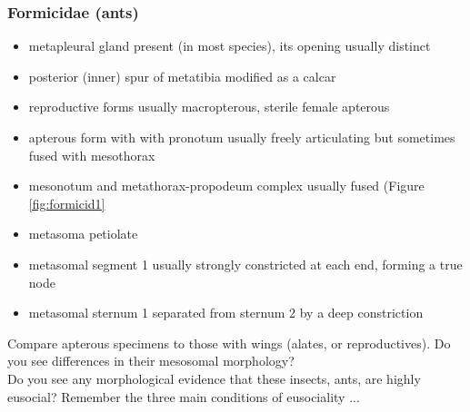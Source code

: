 \documentclass[letterpaper, 11pt]{article}
\begin{document}
\subsubsection{Formicidae (ants)}
\begin{itemize}
\item metapleural gland present (in most species), its opening usually distinct
\item posterior (inner) spur of metatibia modified as a calcar 
\item reproductive forms usually macropterous, sterile female apterous 
\item apterous form with with pronotum usually freely articulating but sometimes fused with mesothorax
\item mesonotum and metathorax-propodeum complex usually fused (Figure \ref{fig:formicid1}
\item metasoma petiolate 
\item metasomal segment 1 usually strongly constricted at each end, forming a true node
\item metasomal sternum 1 separated from sternum 2 by a deep constriction
\end{itemize}
Compare apterous specimens to those with wings (alates, or reproductives). Do you see differences in their mesosomal morphology? \\

\noindent{}Do you see any morphological evidence that these insects, ants, are highly eusocial? Remember the three main conditions of eusociality ...\\
\end{document}
